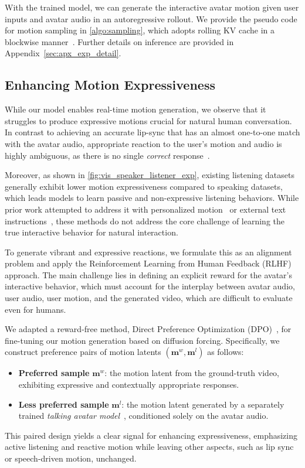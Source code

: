 With the trained model, we can generate the interactive avatar motion given user inputs and avatar audio in an autoregressive rollout. We provide the pseudo code for motion sampling in \cref{algo:sampling}, which adopts rolling KV cache in a blockwise manner~\citep{causvid, self_forcing}. Further details on inference are provided in Appendix~\ref{sec:apx_exp_detail}.

\subsection{Enhancing Motion Expressiveness} \label{sec:dpo}
While our model enables real-time motion generation, we observe that it struggles to produce expressive motions crucial for natural human conversation. In contrast to achieving an accurate lip-sync that has an almost one-to-one match with the avatar audio, appropriate reaction to the user's motion and audio is highly ambiguous, as there is no single \emph{correct} response~\citep{l2l, diffusion_listening, customlistener}. 

Moreover, as shown in \cref{fig:vis_speaker_listener_exp}, existing listening datasets generally exhibit lower motion expressiveness compared to speaking datasets, which leads models to learn passive and non-expressive listening behaviors.
While prior work attempted to address it with personalized motion~\citep{l2l} or external text instructions~\citep{customlistener}, these methods do not address the core challenge of learning the true interactive behavior for natural interaction.

To generate vibrant and expressive reactions, we formulate this as an alignment problem and apply the Reinforcement Learning from Human Feedback (RLHF)~\citep{ouyang2022training} approach. 
The main challenge lies in defining an explicit reward for the avatar’s interactive behavior, which must account for the interplay between avatar audio, user audio, user motion, and the generated video, which are difficult to evaluate even for humans.

We adapted a reward-free method, Direct Preference Optimization (DPO)~\citep{rafailov2023dpo, wallace2024diffusiondpo}, for fine-tuning our motion generation based on diffusion forcing. Specifically, we construct preference pairs of motion latents $(\mathbf{m}^w, \mathbf{m}^l)$ as follows:
\begin{itemize}[leftmargin=1.5em]
\item \textbf{Preferred sample} $\mathbf{m}^w$: the motion latent from the ground-truth video, exhibiting expressive and contextually appropriate responses.
\item \textbf{Less preferred sample} $\mathbf{m}^l$: the motion latent generated by a separately trained \textit{talking avatar model}~\citep{float}, conditioned solely on the avatar audio.
\end{itemize}
This paired design yields a clear signal for enhancing expressiveness, emphasizing active listening and reactive motion while leaving other aspects, such as lip sync or speech-driven motion, unchanged.

